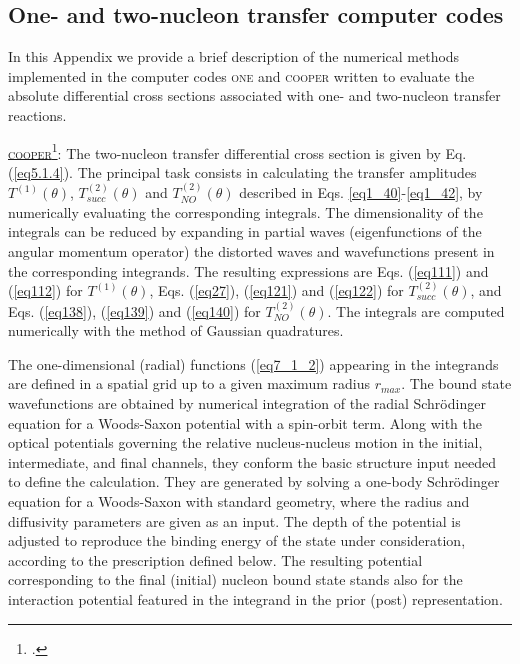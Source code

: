 \begin{subappendices}
\section{One- and two-nucleon transfer computer codes}\label{C8AppD}
In this Appendix we provide a brief description of the numerical methods implemented in the computer codes \textsc{one} and \textsc{cooper} written to evaluate the absolute differential cross sections associated with one- and two-nucleon transfer reactions.


 
 
 
 \underline{\textsc{cooper}}\footnote{\cite{Potel:12c}.}: The two-nucleon transfer differential cross section is given by Eq. (\ref{eq5.1.4}).  The principal task consists in calculating the transfer amplitudes $T^{(1)}(\theta)$, $T^{(2)}_{succ}(\theta)$ and $T^{(2)}_{NO}(\theta)$ described in Eqs. \ref{eq1_40}-\ref{eq1_42}, by numerically evaluating the corresponding integrals.  The dimensionality of the integrals  can be reduced by expanding in partial waves (eigenfunctions of the angular momentum operator) the distorted waves and wavefunctions present in the corresponding integrands. The resulting expressions are Eqs. (\ref{eq111}) and (\ref{eq112}) for $T^{(1)}(\theta)$, Eqs. (\ref{eq27}), (\ref{eq121}) and (\ref{eq122}) for $T^{(2)}_{succ}(\theta)$, and Eqs. (\ref{eq138}), (\ref{eq139}) and (\ref{eq140}) for $T^{(2)}_{NO}(\theta)$. The integrals are computed numerically with the method of Gaussian quadratures. 


The one-dimensional (radial) functions (\ref{eq7_1_2}) appearing in the integrands are defined in a spatial grid up to a given maximum radius $r_{max}$. The bound state  wavefunctions are obtained by numerical integration of the radial Schr\"odinger equation for a Woods-Saxon potential with a spin-orbit term. Along with the optical potentials governing the relative nucleus-nucleus motion in the initial, intermediate, and final channels, they conform the basic structure input needed to define the calculation. They are generated by solving a one-body Schr\"odinger equation for a Woods-Saxon with standard geometry, where the radius and diffusivity parameters are given as an input. The depth of the potential is adjusted to reproduce the binding energy of the state under consideration, according to the prescription defined below. The resulting potential corresponding to the final (initial) nucleon bound state stands also for the interaction potential featured in the integrand in the prior (post) representation. 


\end{subappendices}
